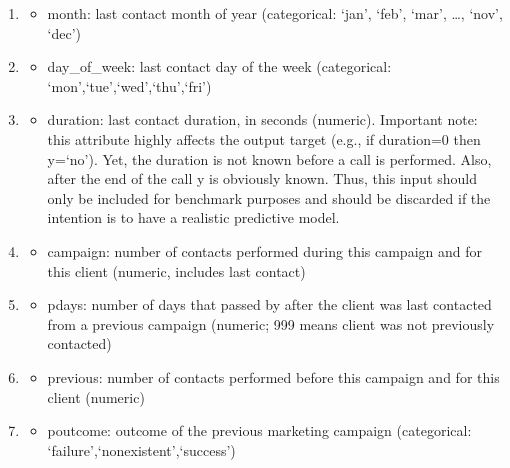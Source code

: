 \documentclass[
  letterpaper,
  DIV=11,
  numbers=noendperiod]{scrartcl}
\providecommand{\tightlist}{%
  \setlength{\itemsep}{0pt}\setlength{\parskip}{0pt}}\usepackage{longtable,booktabs,array}
\begin{document}
\begin{enumerate}
\item
  \begin{itemize}
  \tightlist
  \item
    month: last contact month of year (categorical: `jan', `feb', `mar',
    \ldots, `nov', `dec')
  \end{itemize}
\item
  \begin{itemize}
  \tightlist
  \item
    day\_of\_week: last contact day of the week (categorical:
    `mon',`tue',`wed',`thu',`fri')
  \end{itemize}
\item
  \begin{itemize}
  \tightlist
  \item
    duration: last contact duration, in seconds (numeric). Important
    note: this attribute highly affects the output target (e.g., if
    duration=0 then y=`no'). Yet, the duration is not known before a
    call is performed. Also, after the end of the call y is obviously
    known. Thus, this input should only be included for benchmark
    purposes and should be discarded if the intention is to have a
    realistic predictive model.
  \end{itemize}
\item
  \begin{itemize}
  \tightlist
  \item
    campaign: number of contacts performed during this campaign and for
    this client (numeric, includes last contact)
  \end{itemize}
\item
  \begin{itemize}
  \tightlist
  \item
    pdays: number of days that passed by after the client was last
    contacted from a previous campaign (numeric; 999 means client was
    not previously contacted)
  \end{itemize}
\item
  \begin{itemize}
  \tightlist
  \item
    previous: number of contacts performed before this campaign and for
    this client (numeric)
  \end{itemize}
\item
  \begin{itemize}
  \tightlist
  \item
    poutcome: outcome of the previous marketing campaign (categorical:
    `failure',`nonexistent',`success')

\end{itemize}
\end{enumerate}
\end{document}
